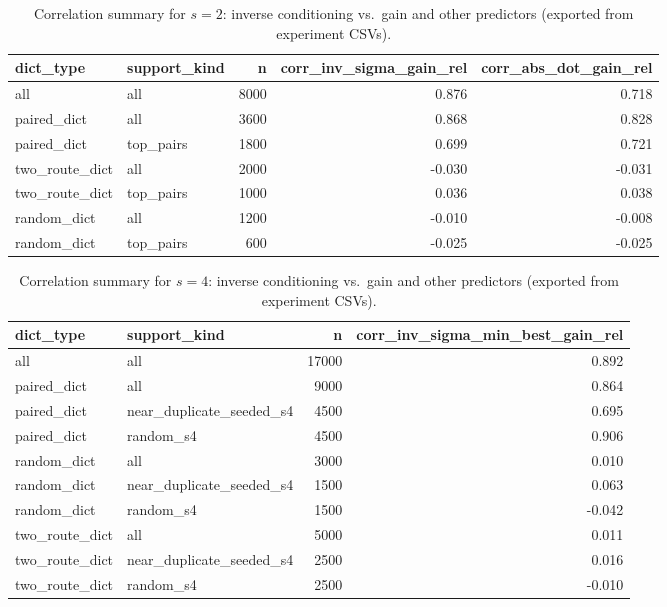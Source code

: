 \documentclass[11pt]{article}
\theoremstyle{plain}
\theoremstyle{definition}
\theoremstyle{remark}
\begin{document}
\begin{table}[t]
\centering
\begin{tabular}{llrrr}
\toprule
dict\_type & support\_kind & n & corr\_inv\_sigma\_gain\_rel & corr\_abs\_dot\_gain\_rel \\
\midrule
all & all & 8000 & 0.876 & 0.718 \\
paired\_dict & all & 3600 & 0.868 & 0.828 \\
paired\_dict & top\_pairs & 1800 & 0.699 & 0.721 \\
two\_route\_dict & all & 2000 & -0.030 & -0.031 \\
two\_route\_dict & top\_pairs & 1000 & 0.036 & 0.038 \\
random\_dict & all & 1200 & -0.010 & -0.008 \\
random\_dict & top\_pairs & 600 & -0.025 & -0.025 \\
\bottomrule
\end{tabular}
 \caption{Correlation summary for \(s=2\): inverse conditioning vs.\ gain and other predictors (exported from experiment CSVs).}
\label{tab:cond_corr_s2}
\end{table}

\begin{table}[t]
\centering
\begin{tabular}{llrr}
\toprule
dict\_type & support\_kind & n & corr\_inv\_sigma\_min\_best\_gain\_rel \\
\midrule
all & all & 17000 & 0.892 \\
paired\_dict & all & 9000 & 0.864 \\
paired\_dict & near\_duplicate\_seeded\_s4 & 4500 & 0.695 \\
paired\_dict & random\_s4 & 4500 & 0.906 \\
random\_dict & all & 3000 & 0.010 \\
random\_dict & near\_duplicate\_seeded\_s4 & 1500 & 0.063 \\
random\_dict & random\_s4 & 1500 & -0.042 \\
two\_route\_dict & all & 5000 & 0.011 \\
two\_route\_dict & near\_duplicate\_seeded\_s4 & 2500 & 0.016 \\
two\_route\_dict & random\_s4 & 2500 & -0.010 \\
\bottomrule
\end{tabular}
 \caption{Correlation summary for \(s=4\): inverse conditioning vs.\ gain and other predictors (exported from experiment CSVs).}
\label{tab:cond_corr_s4}
\end{table}
\end{document}
